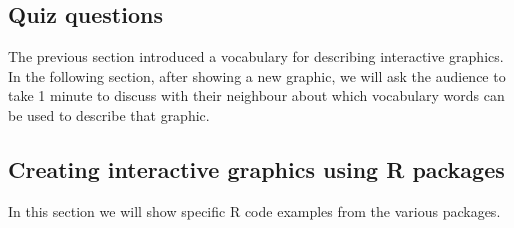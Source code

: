 \documentclass[11pt]{article}
\begin{document}
\subsection{Quiz questions}
\label{sec:orgheadline8}

The previous section introduced a vocabulary for describing
interactive graphics. In the following section, after showing a new
graphic, we will ask the audience to take 1 minute to discuss with
their neighbour about which vocabulary words can be used to describe
that graphic.

\subsection{Creating interactive graphics using R packages}
\label{sec:orgheadline9}

In this section we will show specific R code examples from the various
packages.
\end{document}
